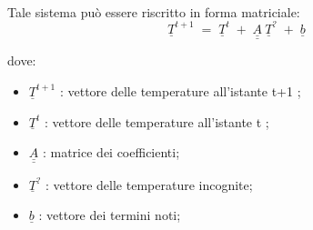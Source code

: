 \noindent
\\\\\\Tale sistema può essere riscritto in forma matriciale:\\
$$
\underline{T}^{t+1} \;=\; \underline{T}^{t} \;+\;  \underline{\underline{A}} \:  \underline{T}^{?} \;+\;  \underline{b} 
$$


\noindent
dove:
\begin{itemize}[label=·, topsep=0pt, partopsep=0pt, parsep=0pt, itemsep=0pt]
	\item \textit{$\underline{T}^{t+1}$} : vettore delle temperature all'istante t+1 ;
	\item \textit{$\underline{T}^{t}$} : vettore delle temperature all'istante t ;
	\item \textit{$\underline{\underline{A}}$} : matrice dei coefficienti;
	\item \textit{$\underline{T}^{?}$} : vettore delle temperature incognite;
	\item \textit{$\underline{b}$} : vettore dei termini noti;
\end{itemize}


\newpage


